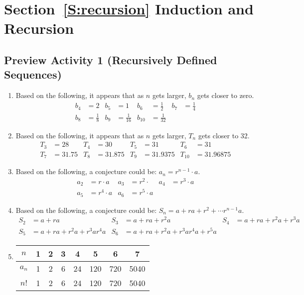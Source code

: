 \section*{Section~\ref{S:recursion} Induction and Recursion}

\subsection*{Preview Activity 1 (Recursively Defined Sequences)}
\begin{enumerate} 
  \item Based on the following, it appears that as $n$ gets larger, $b_n$ gets closer to zero.
\begin{align*}
b_4 &= 2   & b_5 &= 1 &  b_6 &= \frac{1}{2} &  b_7 &= \frac{1}{4} \\
b_8 &= \frac{1}{8} &  b_9 &= \frac{1}{16}  &  b_{10} &= \frac{1}{32} 
\end{align*}
  \item Based on the following, it appears that as $n$ gets larger, $T_n$ gets closer to 32.
\begin{align*}
T_3 &= 28  &  T_4 &= 30   & T_5 &= 31 &  T_6 &= 31  \\
T_7 &= 31.75 & T_8 &= 31.875 &  T_9 &= 31.9375  &  T_{10} &= 31.96875 
\end{align*}

\item Based on the following, a conjecture could be:  $a_n = r^{n-1} \cdot a$.
\begin{align*}
a_2 &= r \cdot a  &  a_3 &= r^2 \cdot & a_4 &= r^3 \cdot a \\
a_5 &= r^4 \cdot a & a_6 &= r^5 \cdot a
\end{align*}

\item Based on the following, a conjecture could be:  $S_n = a + ra + r^2 + \cdots r^{n-1} a$.
\begin{align*}
S_2 &= a + ra  &  S_3 &= a + ra + r^2 a  &  S_4 &= a + ra + r^2 a + r^3 a \\
S_5 &= a + ra + r^2 a + r^3 a r^4 a & S_6 &= a + ra + r^2 a + r^3 a r^4 a + r^5 a
\end{align*}

\item
\begin{tabular}[t]{| c | c | c | c | c | c | c | c |} \hline
$n$  &  1  &  2  &  3  &  4  &  5  &  6  &  7  \\ \hline
$a_n$ &  1  &  2  &  6  &  24  &  120  &  720  &  5040  \\ \hline
$n!$  &  1  &  2  &  6  &  24  &  120  &  720  &  5040  \\ \hline
\end{tabular}


\end{enumerate}
